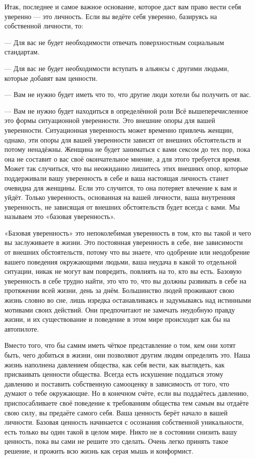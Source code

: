 Итак, последнее и самое важное основание, которое даст вам право вести себя уверенно --- это личность. Если вы ведёте себя уверенно, базируясь на собственной личности, то:

--- Для вас не будет необходимости отвечать поверхностным социальным стандартам.

--- Для вас не будет необходимости вступать в альянсы с другими людьми, которые добавят вам ценности.

--- Вам не нужно будет иметь что то, что другие люди хотели бы получить от вас.

--- Вам не нужно будет находиться в определённой роли Всё вышеперечисленное это формы ситуационной уверенности. Это внешние опоры для вашей уверенности. Ситуационная уверенность может временно привлечь женщин, однако, эти опоры для вашей уверенности зависят от внешних обстоятельств и потому ненадёжны. Женщина не будет заниматься с вами сексом до тех пор, пока она не составит о вас своё окончательное мнение, а для этого требуется время. Может так случиться, что вы неожиданно лишитесь этих внешних опор, которые поддерживали вашу уверенность в себе и ваша настоящая личность станет очевидна для женщины. Если это случится, то она потеряет влечение к вам и уйдёт. Только уверенность, основанная на вашей личности, ваша внутренняя уверенность, не зависящая от внешних обстоятельств будет всегда с вами. Мы называем это «базовая уверенность».

«Базовая уверенность» это непоколебимая уверенность в том, кто вы такой и чего вы заслуживаете в жизни. Это постоянная уверенность в себе, вне зависимости от внешних обстоятельств, потому что вы знаете, что одобрение или неодобрение вашего поведения окружающими людьми, ваша неудача в какой то отдельной ситуации, никак не могут вам повредить, повлиять на то, кто вы есть. Базовую уверенность в себе трудно найти, это что то, что вы должны развивать в себе на протяжении всей жизни, день за днём. Большинство людей проживают свою жизнь словно во сне, лишь изредка останавливаясь и задумываясь над истинными мотивами своих действий. Они предпочитают не замечать неудобную правду жизни, и их существование и поведение в этом мире происходит как бы на автопилоте.

Вместо того, что бы самим иметь чёткое представление о том, кем они хотят быть, чего добиться в жизни, они позволяют другим людям определять это. Наша жизнь наполнена давлением общества, как себя вести, как выглядеть, как присваивать ценности общества. Всегда есть искушение поддаться этому давлению и поставить собственную самооценку в зависимость от того, что думают о тебе окружающие. Но в конечном счёте, если вы поддаётесь давлению, приспосабливаете своё поведение к требованиям общества тем самым вы отдаёте свою силу, вы предаёте самого себя. Ваша ценность берёт начало в вашей личности. Базовая ценность начинается с осознания собственной уникальности, есть только вы один такой в целом мире. Никто не в состоянии снизить вашу ценность, пока вы сами не решите это сделать. Очень легко принять такое решение, и прожить всю жизнь как серая мышь и конформист.

